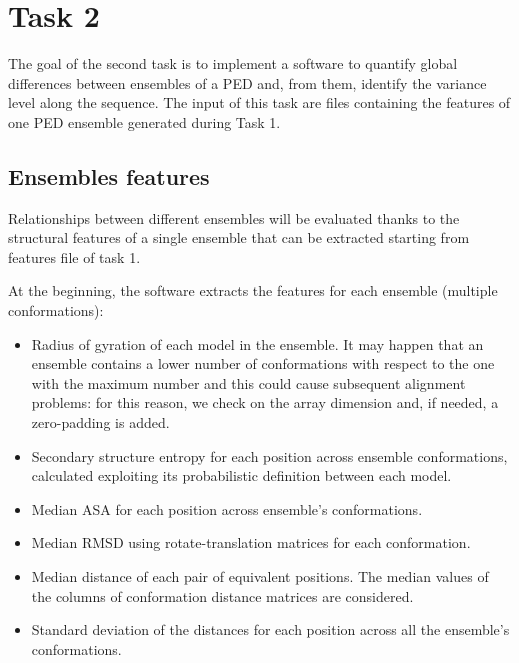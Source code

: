 \section{Task 2}\label{sec:task2}

The goal of the second task is to implement a software to quantify global differences between ensembles of a PED and, from them, identify the variance level along the sequence. The input of this task are files containing the features of one PED ensemble generated during Task 1.

\subsection{Ensembles features}
Relationships between different ensembles will be evaluated thanks to the structural features of a single ensemble that can be extracted starting from features file of task 1.

At the beginning, the software extracts the features for each ensemble (multiple conformations):
\begin{itemize}
\item Radius of gyration of each model in the ensemble. It may happen that an ensemble contains a lower number of conformations with respect to the one with the maximum number and this could cause subsequent alignment problems: for this reason, we check on the array dimension and, if needed, a zero-padding is added.
\item Secondary structure entropy for each position across ensemble conformations, calculated exploiting its probabilistic definition between each model. 
\item Median ASA for each position across ensemble's conformations. 
\item Median RMSD using rotate-translation matrices for each conformation.
\item Median distance of each pair of equivalent positions. The median values of the columns of conformation distance matrices are considered.
\item Standard deviation of the distances for each position across all the ensemble's conformations.
\end{itemize}


